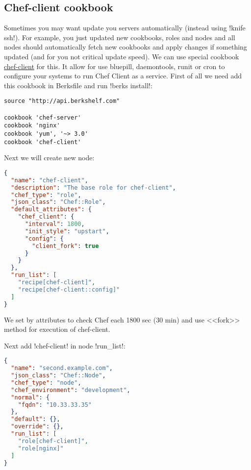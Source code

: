 \subsection{Chef-client cookbook}

Sometimes you may want update you servers automatically (instead using \inline!knife ssh!). For example, you just updated new cookbooks, roles and nodes and all nodes should automatically fetch new cookbooks and apply changes if something updated (and for you not critical update speed). We can use special cookbook \href{https://supermarket.getchef.com/cookbooks/chef-client}{chef-client} for this. It allow for use bluepill, daemontools, runit or cron to configure your systems to run Chef Client as a service. First of all we need add this cookbook in Berksfile and run \inline!berks install!:

\begin{lstlisting}[label=lst:my-server-cloud-knife-ssh6,title=my-server-cloud/Berksfile]
source "http://api.berkshelf.com"

cookbook 'chef-server'
cookbook 'nginx'
cookbook 'yum', '~> 3.0'
cookbook 'chef-client'
\end{lstlisting}

Next we will create new node:

\begin{lstlisting}[language=JSON,label=lst:my-server-cloud-knife-ssh7,title=my-server-cloud/roles/chef-client.json]
{
  "name": "chef-client",
  "description": "The base role for chef-client",
  "chef_type": "role",
  "json_class": "Chef::Role",
  "default_attributes": {
    "chef_client": {
      "interval": 1800,
      "init_style": "upstart",
      "config": {
        "client_fork": true
      }
    }
  },
  "run_list": [
    "recipe[chef-client]",
    "recipe[chef-client::config]"
  ]
}
\end{lstlisting}

We set by attributes to check Chef each 1800 sec (30 min) and use <<fork>> method for execution of chef-client.

Next add \inline!chef-client! in node \inline!run_list!:

\begin{lstlisting}[language=JSON,label=lst:my-server-cloud-knife-ssh8,title=my-server-cloud/nodes/second.example.com.json]
{
  "name": "second.example.com",
  "json_class": "Chef::Node",
  "chef_type": "node",
  "chef_environment": "development",
  "normal": {
    "fqdn": "10.33.33.35"
  },
  "default": {},
  "override": {},
  "run_list": [
    "role[chef-client]",
    "role[nginx]"
  ]
}
\end{lstlisting}


